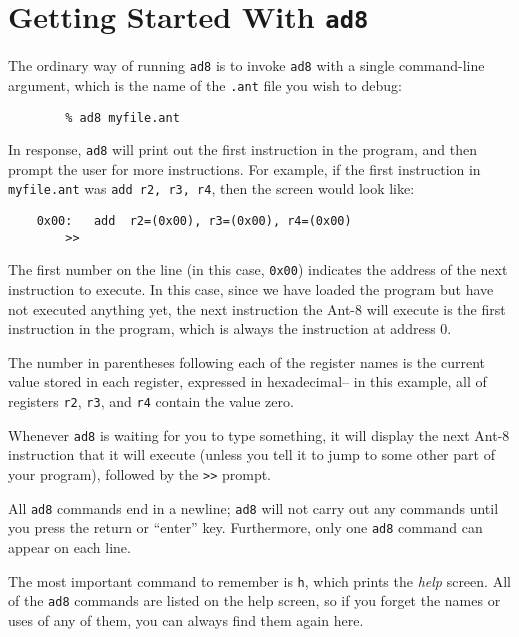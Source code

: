 %

\section{Getting Started With {\tt ad8}}

The ordinary way of running {\tt ad8} is to invoke
{\tt ad8} with a single command-line argument, which is the name of
the {\tt .ant} file you wish to debug: 

\begin{verbatim}
        % ad8 myfile.ant
\end{verbatim}

In response, {\tt ad8} will print out the first instruction in the
program, and then prompt the user for more instructions.  For example,
if the first instruction in {\tt myfile.ant} was {\tt add r2, r3, r4},
then the screen would look like:

\begin{verbatim}
	0x00:   add  r2=(0x00), r3=(0x00), r4=(0x00)
        >> 
\end{verbatim}

The first number on the line (in this case, {\tt 0x00}) indicates the
address of the next instruction to execute.  In this case, since we
have loaded the program but have not executed anything yet, the next
instruction the {\sc Ant-8} will execute is the first instruction in the
program, which is always the instruction at address 0.

The number in parentheses following each of the register names is the
current value stored in each register, expressed in hexadecimal-- in
this example, all of registers {\tt r2}, {\tt r3}, and {\tt r4}
contain the value zero.

Whenever {\tt ad8} is waiting for you to type something, it will
display the next {\sc Ant-8} instruction that it will execute (unless
you tell it to jump to some other part of your program), followed by
the \verb$>>$ prompt.

All {\tt ad8} commands end in a newline; {\tt ad8} will not
carry out any commands until you press the return or ``enter'' key.
Furthermore, only one {\tt ad8} command can appear on each line.

The most important command to remember is {\tt h}, which prints the
{\em help} screen.  All of the {\tt ad8} commands are listed on the
help screen, so if you forget the names or uses of any of them, you
can always find them again here. 

